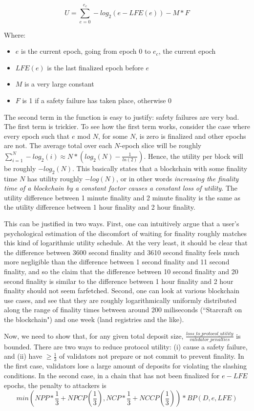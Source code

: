\documentclass[12pt]{article}
\begin{document}
$$U = \sum_{e = 0}^{e_c} -log_2(e - LFE(e)) - M * F$$

Where:

\begin{itemize}
\item $e$ is the current epoch, going from epoch $0$ to $e_c$, the current epoch
\item $LFE(e)$ is the last finalized epoch before $e$
\item $M$ is a very large constant
\item $F$ is 1 if a safety failure has taken place, otherwise 0
\end{itemize}

The second term in the function is easy to justify: safety failures are very bad. The first term is trickier. To see how the first term works, consider the case where every epoch such that $e$ mod $N$, for some $N$, is zero is finalized and other epochs are not. The average total over each $N$-epoch slice will be roughly $\sum_{i=1}^N -log_2(i) \approx N * (log_2(N) - \frac{1}{ln(2)})$. Hence, the utility per block will be roughly $-log_2(N)$. This basically states that a blockchain with some finality time $N$ has utility roughly $-log(N)$, or in other words \textit{increasing the finality time of a blockchain by a constant factor causes a constant loss of utility}. The utility difference between 1 minute finality and 2 minute finality is the same as the utility difference between 1 hour finality and 2 hour finality.

This can be justified in two ways. First, one can intuitively argue that a user's psychological estimation of the discomfort of waiting for finality roughly matches this kind of logarithmic utility schedule. At the very least, it should be clear that the difference between 3600 second finality and 3610 second finality feels much more negligible than the difference between 1 second finality and 11 second finality, and so the claim that the difference between 10 second finality and 20 second finality is similar to the difference between 1 hour finality and 2 hour finality should not seem farfetched. Second, one can look at various blockchain use cases, and see that they are roughly logarithmically uniformly distributed along the range of finality times between around 200 miliseconds (``Starcraft on the blockchain") and one week (land registries and the like).

Now, we need to show that, for any given total deposit size, $\frac{loss\_to\_protocol\_utility}{validator\_penalties}$ is bounded. There are two ways to reduce protocol utility: (i) cause a safety failure, and (ii) have $\ge \frac{1}{3}$ of validators not prepare or not commit to prevent finality. In the first case, validators lose a large amount of deposits for violating the slashing conditions. In the second case, in a chain that has not been finalized for $e - LFE$ epochs, the penalty to attackers is $$min(NPP * \frac{1}{3} + NPCP(\frac{1}{3}), NCP * \frac{1}{3} + NCCP(\frac{1}{3})) * BP(D, e, LFE)$$
\end{document}
